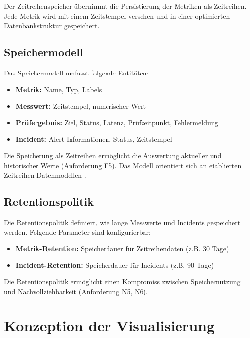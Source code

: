 Der Zeitreihenspeicher übernimmt die Persistierung der Metriken als Zeitreihen. Jede Metrik wird mit einem Zeitstempel versehen und in einer optimierten Datenbankstruktur gespeichert.

\subsection{Speichermodell}
\label{subsec:speichermodell}

Das Speichermodell umfasst folgende Entitäten:

\begin{itemize}
    \item \textbf{Metrik:} Name, Typ, Labels
    \item \textbf{Messwert:} Zeitstempel, numerischer Wert
    \item \textbf{Prüfergebnis:} Ziel, Status, Latenz, Prüfzeitpunkt, Fehlermeldung
    \item \textbf{Incident:} Alert-Informationen, Status, Zeitstempel
\end{itemize}

Die Speicherung als Zeitreihen ermöglicht die Auswertung aktueller und historischer Werte (Anforderung F5). Das Modell orientiert sich an etablierten Zeitreihen-Datenmodellen \cite{time-series-database-patterns}.

\subsection{Retentionspolitik}
\label{subsec:retentionspolitik}

Die Retentionspolitik definiert, wie lange Messwerte und Incidents gespeichert werden. Folgende Parameter sind konfigurierbar:

\begin{itemize}
    \item \textbf{Metrik-Retention:} Speicherdauer für Zeitreihendaten (z.B. 30 Tage)
    \item \textbf{Incident-Retention:} Speicherdauer für Incidents (z.B. 90 Tage)
\end{itemize}

Die Retentionspolitik ermöglicht einen Kompromiss zwischen Speichernutzung und Nachvollziehbarkeit (Anforderung N5, N6).

\section{Konzeption der Visualisierung}
\label{sec:konzeption-visualisierung}

